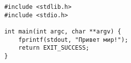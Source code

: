 \documentclass[11pt]{article}
\begin{document}
\begin{verbatim}
    #include <stdlib.h>
    #include <stdio.h>

    int main(int argc, char **argv) {
        fprintf(stdout, "Привет мир!");
        return EXIT_SUCCESS;
    }
\end{verbatim}
\end{document}
